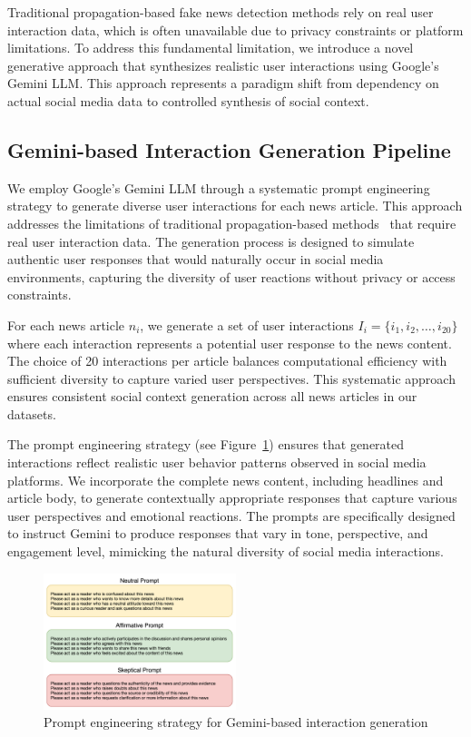 Traditional propagation-based fake news detection methods rely on real user interaction data, which is often unavailable due to privacy constraints or platform limitations. To address this fundamental limitation, we introduce a novel generative approach that synthesizes realistic user interactions using Google's Gemini LLM. This approach represents a paradigm shift from dependency on actual social media data to controlled synthesis of social context.

\subsection{Gemini-based Interaction Generation Pipeline}

We employ Google's Gemini LLM through a systematic prompt engineering strategy to generate diverse user interactions for each news article. This approach addresses the limitations of traditional propagation-based methods~\cite{ma2016detecting, shu2017fake} that require real user interaction data. The generation process is designed to simulate authentic user responses that would naturally occur in social media environments, capturing the diversity of user reactions without privacy or access constraints.

For each news article $n_i$, we generate a set of user interactions $I_i = \{i_1, i_2, \ldots, i_{20}\}$ where each interaction represents a potential user response to the news content. The choice of 20 interactions per article balances computational efficiency with sufficient diversity to capture varied user perspectives. This systematic approach ensures consistent social context generation across all news articles in our datasets.

The prompt engineering strategy (see Figure~\ref{fig:prompt}) ensures that generated interactions reflect realistic user behavior patterns observed in social media platforms. We incorporate the complete news content, including headlines and article body, to generate contextually appropriate responses that capture various user perspectives and emotional reactions. The prompts are specifically designed to instruct Gemini to produce responses that vary in tone, perspective, and engagement level, mimicking the natural diversity of social media interactions.

\begin{figure}[h]
    \centering
    \includegraphics[width=0.5\textwidth]{context/methodology/fig/prompt.png}
    \caption{Prompt engineering strategy for Gemini-based interaction generation}
    \label{fig:prompt}
\end{figure}

